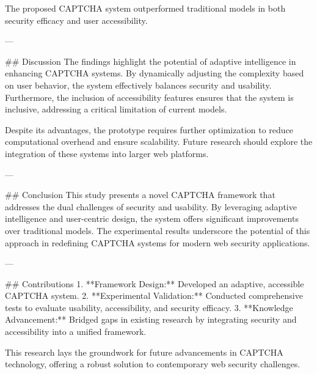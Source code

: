 The proposed CAPTCHA system outperformed traditional models in both security efficacy and user accessibility.

---

## Discussion
The findings highlight the potential of adaptive intelligence in enhancing CAPTCHA systems. By dynamically adjusting the complexity based on user behavior, the system effectively balances security and usability. Furthermore, the inclusion of accessibility features ensures that the system is inclusive, addressing a critical limitation of current models.

Despite its advantages, the prototype requires further optimization to reduce computational overhead and ensure scalability. Future research should explore the integration of these systems into larger web platforms.

---

## Conclusion
This study presents a novel CAPTCHA framework that addresses the dual challenges of security and usability. By leveraging adaptive intelligence and user-centric design, the system offers significant improvements over traditional models. The experimental results underscore the potential of this approach in redefining CAPTCHA systems for modern web security applications.

---

## Contributions
1. **Framework Design:** Developed an adaptive, accessible CAPTCHA system.
2. **Experimental Validation:** Conducted comprehensive tests to evaluate usability, accessibility, and security efficacy.
3. **Knowledge Advancement:** Bridged gaps in existing research by integrating security and accessibility into a unified framework.

This research lays the groundwork for future advancements in CAPTCHA technology, offering a robust solution to contemporary web security challenges.